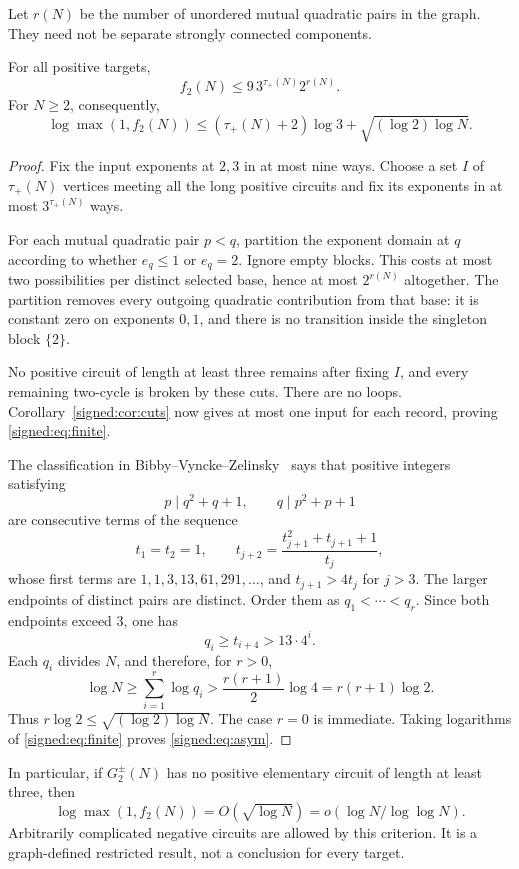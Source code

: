 Let $r(N)$ be the number of unordered mutual quadratic pairs in the graph. They need not be separate strongly connected components.

\begin{theorem}\label{signed:thm:graphbound}
For all positive targets,
\begin{equation}\label{signed:eq:finite}
 \boxed{f_2(N)\le 9\,3^{\tau_+(N)}2^{r(N)}.}
\end{equation}
For $N\ge2$, consequently,
\begin{equation}\label{signed:eq:asym}
 \boxed{\log\max(1,f_2(N))\le
 (\tau_+(N)+2)\log3+\sqrt{(\log2)\log N}.}
\end{equation}
\end{theorem}
\begin{proof}
Fix the input exponents at $2,3$ in at most nine ways. Choose a set $I$ of $\tau_+(N)$ vertices meeting all the long positive circuits and fix its exponents in at most $3^{\tau_+(N)}$ ways.

For each mutual quadratic pair $p<q$, partition the exponent domain at $q$ according to whether $e_q\le1$ or $e_q=2$. Ignore empty blocks. This costs at most two possibilities per distinct selected base, hence at most $2^{r(N)}$ altogether. The partition removes every outgoing quadratic contribution from that base: it is constant zero on exponents $0,1$, and there is no transition inside the singleton block $\{2\}$.

No positive circuit of length at least three remains after fixing $I$, and every remaining two-cycle is broken by these cuts. There are no loops. Corollary~\ref{signed:cor:cuts} now gives at most one input for each record, proving \eqref{signed:eq:finite}.

The classification in Bibby--Vyncke--Zelinsky~\cite[Lemma 5]{bibby} says that positive integers satisfying
\[
 p\mid q^2+q+1,\qquad q\mid p^2+p+1
\]
are consecutive terms of the sequence
\[
 t_1=t_2=1,\qquad
 t_{j+2}=\frac{t_{j+1}^2+t_{j+1}+1}{t_j},
\]
whose first terms are $1,1,3,13,61,291,\ldots$, and $t_{j+1}>4t_j$ for $j>3$.
The larger endpoints of distinct pairs are distinct. Order them as $q_1<\cdots<q_r$. Since both endpoints exceed $3$, one has
\[
 q_i\ge t_{i+4}>13\cdot4^i.
\]
Each $q_i$ divides $N$, and therefore, for $r>0$,
\[
 \log N\ge\sum_{i=1}^r\log q_i>
 \frac{r(r+1)}2\log4=r(r+1)\log2.
\]
Thus $r\log2\le\sqrt{(\log2)\log N}$. The case $r=0$ is immediate. Taking logarithms of \eqref{signed:eq:finite} proves \eqref{signed:eq:asym}.
\end{proof}

In particular, if $G_2^\pm(N)$ has no positive elementary circuit of length at least three, then
\[
 \log\max(1,f_2(N))=O(\sqrt{\log N})
 =o(\log N/\log\log N).
\]
Arbitrarily complicated negative circuits are allowed by this criterion. It is a graph-defined restricted result, not a conclusion for every target.

